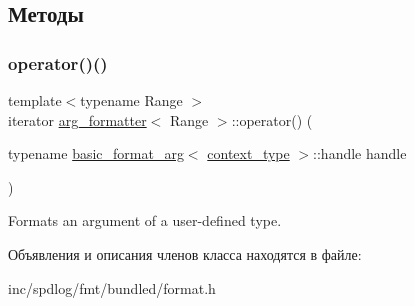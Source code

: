 \subsection{Методы}
\mbox{\label{classarg__formatter_ac8ddd9b78934fc951916a30d46114ab1}} 
\subsubsection{\texorpdfstring{operator()()}{operator()()}}
{\footnotesize\ttfamily template$<$typename Range $>$ \\
iterator \hyperlink{classarg__formatter}{arg\+\_\+formatter}$<$ Range $>$\+::operator() (\begin{DoxyParamCaption}\item[{typename \hyperlink{classbasic__format__arg}{basic\+\_\+format\+\_\+arg}$<$ \hyperlink{classbasic__format__context}{context\+\_\+type} $>$\+::handle}]{handle }\end{DoxyParamCaption})\hspace{0.3cm}{\ttfamily [inline]}}

Formats an argument of a user-\/defined type. 

Объявления и описания членов класса находятся в файле\+:\begin{DoxyCompactItemize}
\item 
inc/spdlog/fmt/bundled/format.\+h\end{DoxyCompactItemize}
